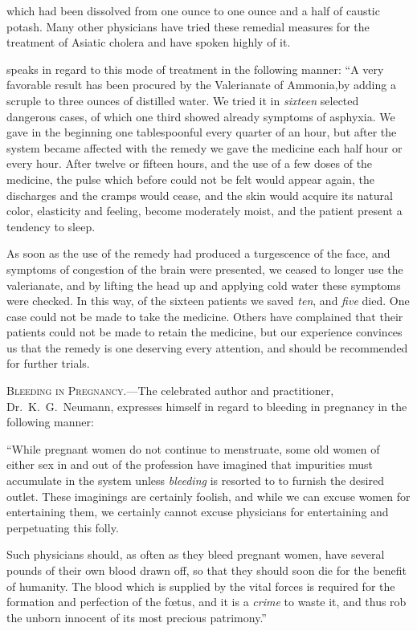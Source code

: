 which had been dissolved from one ounce to one ounce and a half of
caustic potash. Many other physicians have tried these remedial
measures for the treatment of Asiatic cholera and have spoken highly
of it.

 speaks in regard to this mode of treatment
in the following manner: ``A very favorable result has been procured
by the Valerianate of Ammonia,by adding a scruple to three ounces of
distilled water. We tried it in \emph{sixteen} selected dangerous cases, of
which one third showed already symptoms of asphyxia. We gave in
the beginning one tablespoonful every quarter of an hour, but after
the system became affected with the remedy we gave the medicine
each half hour or every hour. After twelve or fifteen hours, and the
use of a few doses of the medicine, the pulse which before could not
be felt would appear again, the discharges and the cramps would cease,
and the skin would acquire its natural color, elasticity and feeling,
become moderately moist, and the patient present a tendency to sleep.

As soon as the use of the remedy had produced a turgescence of the
face, and symptoms of congestion of the brain were presented, we
ceased to longer use the valerianate, and by lifting the head up and
applying cold water these symptoms were checked. In this way, of
the sixteen patients we saved \emph{ten}, and \emph{five} died. One case could not
be made to take the medicine. Others have complained that their
patients could not be made to retain the medicine, but our experience
convinces us that the remedy is one deserving every attention, and
should be recommended for further trials.

\textsc{Bleeding in Pregnancy}.---The celebrated author and practitioner,
Dr.\ K.~G.\ Neumann, expresses himself in regard to bleeding in pregnancy
in the following manner:


``While pregnant women do not continue to menstruate, some old
women of either sex in and out of the profession have imagined that
impurities must accumulate in the system unless \emph{bleeding} is resorted to
to furnish the desired outlet. These imaginings are certainly foolish,
and while we can excuse women for entertaining them, we certainly
cannot excuse physicians for entertaining and perpetuating this folly.

Such physicians should, as often as they bleed pregnant women,
have several pounds of their own blood drawn off, so that they should
soon die for the benefit of humanity. The blood which is supplied by
the vital forces is required for the formation and perfection of the fœtus,
and it is a \emph{crime} to waste it, and thus rob the unborn innocent of its
most precious patrimony.''\endinput
